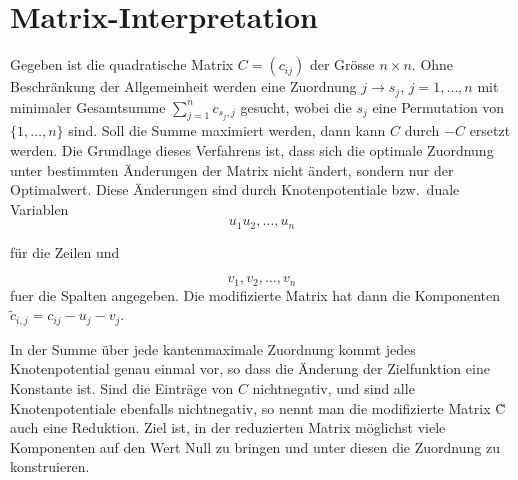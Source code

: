 %
%
%
\section{Matrix-Interpretation
\label{munkres:section:teil4}}
Gegeben ist die quadratische Matrix $C=(c_{ij})$ der Grösse $n\times n$.
Ohne Beschränkung der Allgemeinheit werden eine Zuordnung $j
\rightarrow  s_j$, $j = 1, \dots, n$ mit minimaler Gesamtsumme
$\sum_{j=1}^{n}c_{s_j,j}$ gesucht, wobei die $s_j$ eine Permutation
von $\{1,\ldots ,n\}$ sind.
Soll die Summe maximiert werden, dann kann $C$ durch $-C$ ersetzt werden.
Die Grundlage dieses Verfahrens ist, dass sich die optimale Zuordnung
unter bestimmten Änderungen der Matrix nicht ändert, sondern nur
der Optimalwert.
Diese Änderungen sind durch Knotenpotentiale bzw.~duale Variablen 
\begin{equation}
u_1 u_2,{\dots}, u_n
\end{equation}

für die Zeilen und 

\begin{equation}v_1,v_2,\dots,v_n \end{equation} fuer die Spalten angegeben.
Die modifizierte Matrix hat dann die Komponenten $\tilde{c}_{i,j}
= c_{ij} - u_j - v_j$.

In der Summe über jede kantenmaximale Zuordnung kommt jedes
Knotenpotential genau einmal vor, so dass die Änderung der Zielfunktion
eine Konstante ist.
Sind die Einträge von $C$ nichtnegativ, und sind alle Knotenpotentiale
ebenfalls nichtnegativ, so nennt man die modifizierte Matrix \~{C}
auch eine Reduktion.
Ziel ist, in der reduzierten Matrix möglichst viele Komponenten auf
den Wert Null zu bringen und unter diesen die Zuordnung zu konstruieren.
